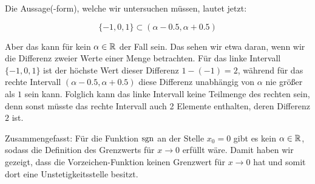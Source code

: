 Die Aussage(-form), welche wir untersuchen müssen, lautet jetzt:

$$
	\lbrace -1, 0, 1 \rbrace \subset ( \alpha - 0.5, \alpha + 0.5 )
$$

Aber das kann für kein $\alpha\in\mathbb{R}$ der Fall sein. Das sehen wir etwa daran, wenn wir die Differenz zweier Werte einer Menge betrachten. Für das linke Intervall $\lbrace -1, 0, 1 \rbrace$ ist der höchste Wert dieser Differenz $1-(-1) = 2$, während für das rechte Intervall $( \alpha - 0.5, \alpha + 0.5 )$ diese Differenz unabhängig von $\alpha$ nie größer als $1$ sein kann. Folglich kann das linke Intervall keine Teilmenge des rechten sein, denn sonst müsste das rechte Intervall auch 2 Elemente enthalten, deren Differenz $2$ ist. 

Zusammengefasst: Für die Funktion $\text{sgn}$ an der Stelle $x_0=0$ gibt es kein $\alpha\in\mathbb{R}$, sodass die Definition des Grenzwerts für $x\to 0$ erfüllt wäre. Damit haben wir gezeigt, dass die Vorzeichen-Funktion keinen Grenzwert für $x\to 0$ hat und somit dort eine Unstetigkeitsstelle besitzt.